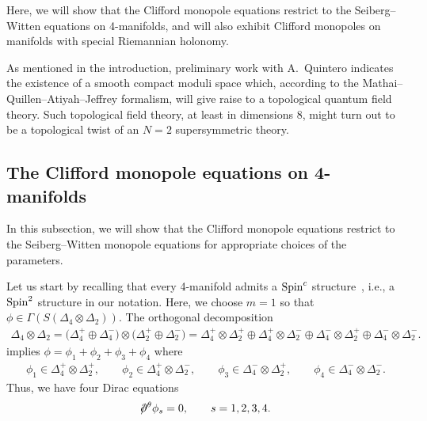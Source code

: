\documentclass[10pt,a4paper]{amsart}
\newcommand{\dirac}{/\kern-5pt\partial}
\numberwithin{equation}{section}
\begin{document}
Here, we will show that the Clifford monopole equations restrict to the Seiberg--Witten equations on 4-manifolds, and will also exhibit Clifford monopoles on manifolds with special Riemannian holonomy.

 As mentioned in the introduction, preliminary work with A.~Quintero indicates the existence of a smooth compact moduli space which, according to the Mathai--Quillen--Atiyah--Jeffrey formalism, will give raise to a topological quantum field theory. Such topological field theory, at least in dimensions $8$, might turn out to be a topological twist of an $N=2$ supersymmetric theory.

\subsection{The Clifford monopole equations on 4-manifolds}

In this subsection, we will show that the Clifford monopole equations restrict to the Seiberg--Witten monopole equations for appropriate choices of the parameters.

Let us start by recalling that every 4-manifold admits a ${\rm Spin}^c$ structure~\cite{Morgan}, i.e., a ${\rm Spin}^2$ structure in our notation. Here, we choose $m=1$ so that $\phi\in\Gamma(S(\Delta_4\otimes \Delta_2))$. The orthogonal decomposition
\begin{gather*}
\Delta_4\otimes \Delta_2 = \big(\Delta_4^+\oplus \Delta_4^-\big)\otimes \big(\Delta_2^+\oplus \Delta_2^-\big) =
 \Delta_4^+\otimes \Delta_2^+ \oplus \Delta_4^+\otimes \Delta_2^- \oplus \Delta_4^-\otimes \Delta_2^+ \oplus \Delta_4^-\otimes \Delta_2^- .
\end{gather*}
implies $\phi=\phi_1+\phi_2+\phi_3+\phi_4$ where
\begin{gather*}
\phi_1 \in \Delta_4^+\otimes\Delta_2^+,\qquad
\phi_2 \in \Delta_4^+\otimes\Delta_2^-,\qquad
\phi_3 \in \Delta_4^-\otimes\Delta_2^+,\qquad
\phi_4 \in \Delta_4^-\otimes\Delta_2^-.
\end{gather*}
Thus, we have four Dirac equations
\begin{gather*}
\dirac^\theta\phi_s =0,\qquad s=1,2,3,4.
\end{gather*}
\end{document}
